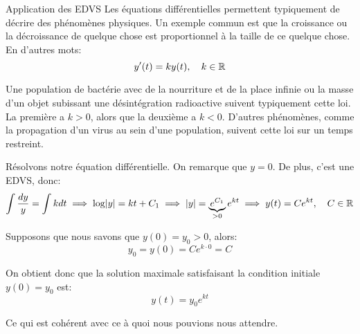 \documentclass[a4paper]{article}
\begin{document}
\begin{parag}{Application des EDVS}
    Les équations différentielles permettent typiquement de décrire des phénomènes physiques. Un exemple commun est que la croissance ou la décroissance de quelque chose est proportionnel à la taille de ce quelque chose. En d'autres mots: 
    \[y'\left(t\right) = ky\left(t\right), \mathspace k \in \mathbb{R}\]
    
    Une population de bactérie avec de la nourriture et de la place infinie ou la masse d'un objet subissant une désintégration radioactive suivent typiquement cette loi. La première a $k > 0$, alors que la deuxième a $k < 0$. D'autres phénomènes, comme la propagation d'un virus au sein d'une population, suivent cette loi sur un temps restreint.

    Résolvons notre équation différentielle. On remarque que $y = 0$. De plus, c'est une EDVS, donc:
    \[\int \frac{dy}{y} = \int k dt \implies \log\left|y\right| = kt + C_1 \implies \left|y\right| = \underbrace{e^{C_1}}_{>0} e^{kt} \implies y\left(t\right) = Ce^{kt}, \mathspace C \in \mathbb{R}\]
    
    Supposons que nous savons que $y\left(0\right) = y_0 > 0$, alors: 
    \[y_0 = y\left(0\right) = Ce^{k\cdot0} = C\]
    
    On obtient donc que la solution maximale satisfaisant la condition initiale $y\left(0\right) = y_0$ est: 
    \[y\left(t\right) = y_0 e^{kt}\]

    Ce qui est cohérent avec ce à quoi nous pouvions nous attendre. 
\end{parag}
\end{document}
